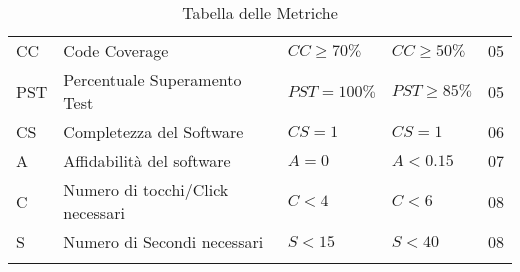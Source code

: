 \begin{longtable}{
		>{\centering}p{}
		>{}p{}
		>{\centering}p{}
		>{\centering}p{}
		>{}p{} }
	CC & Code Coverage & $CC\geq 70\%$ & $CC\geq 50\%$ & 05 \\
	
	PST & Percentuale Superamento Test & $PST=100\%$ & $PST\geq85\%$ & 05 \\
	
	CS & Completezza del Software & $CS=1$ & $CS=1$ & 06 \\
	
	A & Affidabilità del software & $A=0$ & $A < 0.15$ & 07 \\
	
	C & Numero di tocchi/Click necessari & $C<4$ & $C<6$& 08 \\
	
	S & Numero di Secondi necessari & $S<15$ & $S<40$ & 08 \\
	
	
	\caption{Tabella delle Metriche}
\end{longtable}



